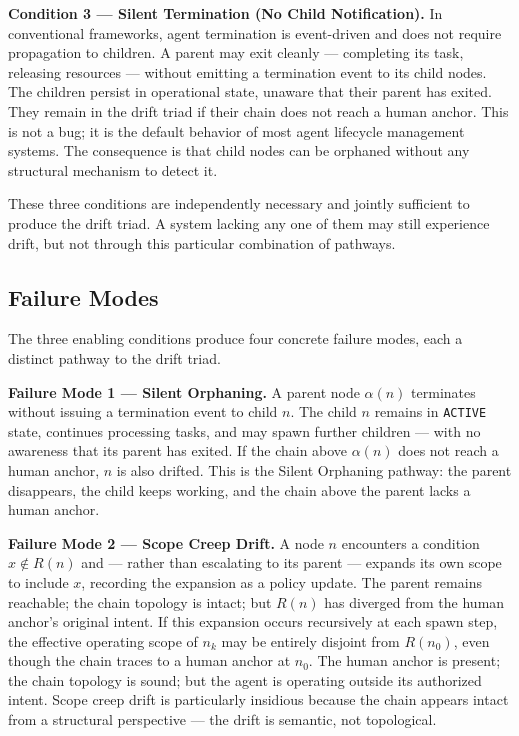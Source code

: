 \medskip
\noindent\textbf{Condition 3 — Silent Termination (No Child Notification).}
In conventional frameworks, agent termination is event-driven and does not require propagation to children. A parent may exit cleanly — completing its task, releasing resources — without emitting a termination event to its child nodes. The children persist in operational state, unaware that their parent has exited. They remain in the drift triad if their chain does not reach a human anchor. This is not a bug; it is the default behavior of most agent lifecycle management systems. The consequence is that child nodes can be orphaned without any structural mechanism to detect it.

These three conditions are independently necessary and jointly sufficient to produce the drift triad. A system lacking any one of them may still experience drift, but not through this particular combination of pathways.

\subsection{Failure Modes}
\label{sec:rs-drift-failure-modes}

The three enabling conditions produce four concrete failure modes, each a distinct pathway to the drift triad.

\medskip
\noindent\textbf{Failure Mode 1 — Silent Orphaning.}
A parent node $\alpha(n)$ terminates without issuing a termination event to child $n$. The child $n$ remains in \texttt{ACTIVE} state, continues processing tasks, and may spawn further children — with no awareness that its parent has exited. If the chain above $\alpha(n)$ does not reach a human anchor, $n$ is also drifted. This is the Silent Orphaning pathway: the parent disappears, the child keeps working, and the chain above the parent lacks a human anchor.

\medskip
\noindent\textbf{Failure Mode 2 — Scope Creep Drift.}
A node $n$ encounters a condition $x \notin R(n)$ and — rather than escalating to its parent — expands its own scope to include $x$, recording the expansion as a policy update. The parent remains reachable; the chain topology is intact; but $R(n)$ has diverged from the human anchor's original intent. If this expansion occurs recursively at each spawn step, the effective operating scope of $n_k$ may be entirely disjoint from $R(n_0)$, even though the chain traces to a human anchor at $n_0$. The human anchor is present; the chain topology is sound; but the agent is operating outside its authorized intent. Scope creep drift is particularly insidious because the chain appears intact from a structural perspective — the drift is semantic, not topological.

